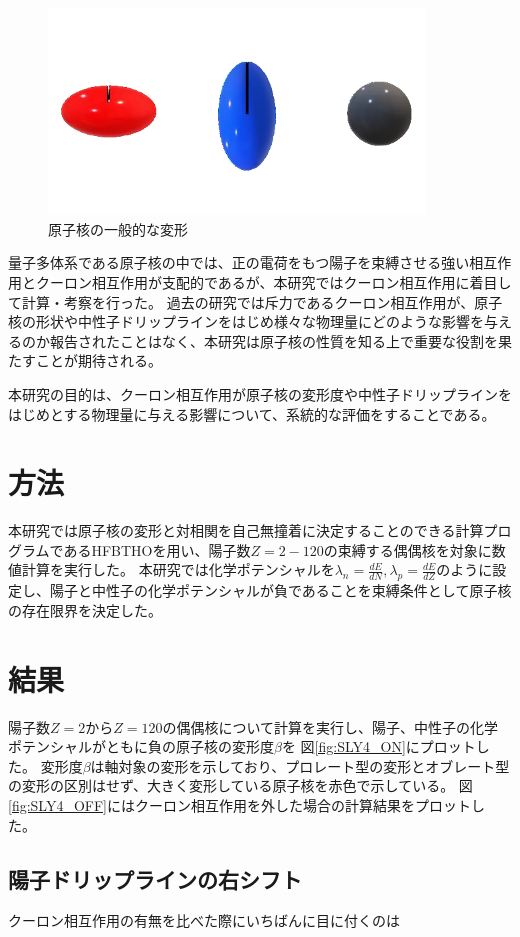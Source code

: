 \documentclass[12pt]{jarticle}
\begin{document}
\begin{figure}[H]
    \centering
    \includegraphics[width=100mm]{../変形図.png}
    \caption{原子核の一般的な変形}\label{fig:deformation}
\end{figure}


量子多体系である原子核の中では、正の電荷をもつ陽子を束縛させる強い相互作用とクーロン相互作用が支配的であるが、本研究ではクーロン相互作用に着目して計算・考察を行った。
過去の研究では斥力であるクーロン相互作用が、原子核の形状や中性子ドリップラインをはじめ様々な物理量にどのような影響を与えるのか報告されたことはなく、本研究は原子核の性質を知る上で重要な役割を果たすことが期待される。

本研究の目的は、クーロン相互作用が原子核の変形度や中性子ドリップラインをはじめとする物理量に与える影響について、系統的な評価をすることである。

\section{方法}
本研究では原子核の変形と対相関を自己無撞着に決定することのできる計算プログラムであるHFBTHOを用い、陽子数$Z=2-120$の束縛する偶偶核を対象に数値計算を実行した。
本研究では化学ポテンシャルを$\lambda_n=\frac{dE}{dN}, \lambda_p=\frac{dE}{dZ}$のように設定し、陽子と中性子の化学ポテンシャルが負であることを束縛条件として原子核の存在限界を決定した。


\section{結果}
陽子数$Z=2$から$Z=120$の偶偶核について計算を実行し、陽子、中性子の化学ポテンシャルがともに負の原子核の変形度$\beta$を 図\ref{fig:SLY4_ON}にプロットした。
変形度$\beta$は軸対象の変形を示しており、プロレート型の変形とオブレート型の変形の区別はせず、大きく変形している原子核を赤色で示している。
図\ref{fig:SLY4_OFF}にはクーロン相互作用を外した場合の計算結果をプロットした。
\subsection{陽子ドリップラインの右シフト}
クーロン相互作用の有無を比べた際にいちばんに目に付くのは
\end{document}
